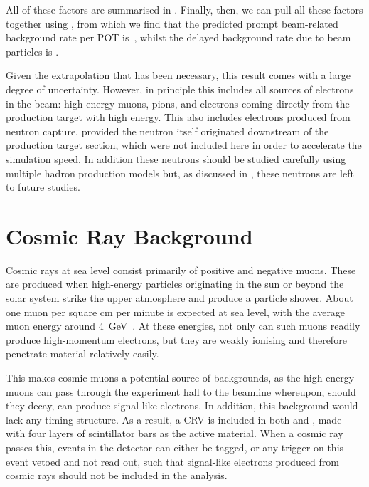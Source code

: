 \TabBgBeamFactors
All of these factors are summarised in .
Finally, then, we can pull all these factors together using , from which we find that the predicted prompt beam-related background rate per POT is~\VarBeamBgPromptPerPOT, whilst the delayed background rate due to beam particles is \VarBeamBgDelayedPerPOT.

Given the extrapolation that has been necessary, this result comes with a large degree of uncertainty.
However, in principle this includes all sources of electrons in the beam: high-energy muons, pions, and electrons coming directly from the production target with high energy.
This also includes electrons produced from neutron capture, provided the neutron itself originated downstream of the production target section, which were not included here in order to accelerate the simulation speed.
In addition these neutrons should be studied carefully using multiple hadron production models but, as discussed in , these neutrons are left to future studies.

\section{Cosmic Ray Background}
\FigBgCosmicPrimary
Cosmic rays at sea level consist primarily of positive and negative muons.
These are produced when high-energy particles originating in the sun or beyond the solar system strike the upper atmosphere and produce a particle shower.
About one muon per square cm per minute is expected at sea level, with the average muon energy around 4~GeV~\cite{PDG2014}.
At these energies, not only can such muons readily produce high-momentum electrons, but they are weakly ionising and therefore penetrate material relatively easily.

This makes cosmic muons a potential source of backgrounds, as the high-energy muons can pass through the experiment hall to the beamline whereupon, should they decay, can produce signal-like electrons.
In addition, this background would lack any timing structure.
As a result, a  \ac{CRV} is included in both \phaseI and \phaseII, made with four layers of scintillator bars as the active material.
When a cosmic ray passes this, events in the detector can either be tagged, or any trigger on this event vetoed and not read out, such that signal-like electrons produced from cosmic rays should not be included in the analysis.


